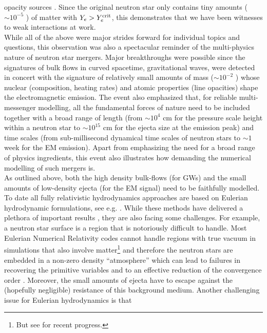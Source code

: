 \documentclass[useAMS,usenatbib]{iopart}
\begin{document}
opacity sources \cite{kasen13a,tanaka13a,tanaka20a}.
Since the original neutron star only contains tiny amounts ($\sim 10^{-5}$ \msun) of matter with
$Y_e>Y_e^{\rm crit}$, this demonstrates that we have been witnesses to weak interactions at work. \\
While all of the above were major strides forward for individual topics and questions, this observation 
was also a spectacular reminder of the multi-physics nature of neutron star mergers. Major breakthroughs
were possible since the signatures of bulk flows in curved spacetime, gravitational waves, were
detected in concert with the signature of relatively small amounts of mass ($\sim 10^{-2}$ \msun)
whose nuclear (composition, heating rates) and atomic properties (line opacities) shape 
the electromagnetic emission. The event also emphasized  that, for reliable multi-messenger 
modelling, all the fundamental forces of nature need to be included together with a broad range 
of length (from $\sim 10^4$ cm for the pressure scale height within a neutron star to $\sim 10^{15}$ cm 
for the ejecta size at the emission peak) and time scales (from sub-millisecond dynamical time scales of 
neutron stars to $\sim 1$ week for the EM emission). Apart from emphasizing the need for a broad range
of physics ingredients, this event also illustrates how demanding the numerical modelling of
such mergers is.
\\
As outlined above, both the high density bulk-flows (for GWs) and the small amounts of 
low-density ejecta (for the EM signal) need to be faithfully modelled.
To date all fully relativistic hydrodynamics approaches are based on Eulerian hydrodynamic 
formulations, see e.g. \cite{alcubierre08,baumgarte10,rezzolla13a,shibata16}. While these
methods have delivered a plethora of important results \cite{baiotti17,duez19a,shibata19a}, they
are also facing some challenges. For example, a neutron star surface is a region that is notoriously 
difficult to handle. Most Eulerian Numerical Relativity codes cannot handle regions with true vacuum
in simulations that also involve matter\footnote{But see
\cite{poudel20} for recent progress.} and therefore the neutron
stars are embedded in a non-zero density ``atmosphere'' which can lead to failures 
in recovering the primitive variables and to an effective reduction of the convergence order \cite{schoepe18}.
Moreover, the  small amounts of ejecta have to escape against the (hopefully negligible)
resistance of this background medium. Another challenging issue for Eulerian hydrodynamics is that
\end{document}
